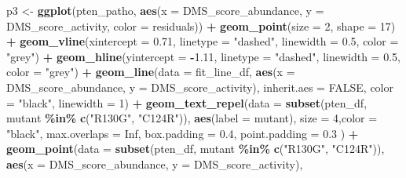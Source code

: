 \documentclass[
]{article}
\newenvironment{Shaded}{\begin{snugshade}}{\end{snugshade}}
\newcommand{\AttributeTok}[1]{\textcolor[rgb]{0.13,0.29,0.53}{#1}}
\newcommand{\ConstantTok}[1]{\textcolor[rgb]{0.56,0.35,0.01}{#1}}
\newcommand{\DecValTok}[1]{\textcolor[rgb]{0.00,0.00,0.81}{#1}}
\newcommand{\FloatTok}[1]{\textcolor[rgb]{0.00,0.00,0.81}{#1}}
\newcommand{\FunctionTok}[1]{\textcolor[rgb]{0.13,0.29,0.53}{\textbf{#1}}}
\newcommand{\NormalTok}[1]{#1}
\newcommand{\OtherTok}[1]{\textcolor[rgb]{0.56,0.35,0.01}{#1}}
\newcommand{\SpecialCharTok}[1]{\textcolor[rgb]{0.81,0.36,0.00}{\textbf{#1}}}
\newcommand{\StringTok}[1]{\textcolor[rgb]{0.31,0.60,0.02}{#1}}
\begin{document}
\begin{Shaded}
\begin{Highlighting}[]
\NormalTok{p3 }\OtherTok{\textless{}{-}} \FunctionTok{ggplot}\NormalTok{(pten\_patho, }\FunctionTok{aes}\NormalTok{(}\AttributeTok{x =}\NormalTok{ DMS\_score\_abundance, }\AttributeTok{y =}\NormalTok{ DMS\_score\_activity, }\AttributeTok{color =}\NormalTok{ residuals)) }\SpecialCharTok{+}
  \FunctionTok{geom\_point}\NormalTok{(}\AttributeTok{size =} \DecValTok{2}\NormalTok{, }\AttributeTok{shape =} \DecValTok{17}\NormalTok{) }\SpecialCharTok{+}
  \FunctionTok{geom\_vline}\NormalTok{(}\AttributeTok{xintercept =} \FloatTok{0.71}\NormalTok{, }\AttributeTok{linetype =} \StringTok{"dashed"}\NormalTok{, }\AttributeTok{linewidth =} \FloatTok{0.5}\NormalTok{, }\AttributeTok{color =} \StringTok{"grey"}\NormalTok{) }\SpecialCharTok{+}
  \FunctionTok{geom\_hline}\NormalTok{(}\AttributeTok{yintercept =} \SpecialCharTok{{-}}\FloatTok{1.11}\NormalTok{, }\AttributeTok{linetype =} \StringTok{"dashed"}\NormalTok{, }\AttributeTok{linewidth =} \FloatTok{0.5}\NormalTok{, }\AttributeTok{color =} \StringTok{"grey"}\NormalTok{) }\SpecialCharTok{+}
  \FunctionTok{geom\_line}\NormalTok{(}\AttributeTok{data =}\NormalTok{ fit\_line\_df, }\FunctionTok{aes}\NormalTok{(}\AttributeTok{x =}\NormalTok{ DMS\_score\_abundance, }\AttributeTok{y =}\NormalTok{ DMS\_score\_activity),}
            \AttributeTok{inherit.aes =} \ConstantTok{FALSE}\NormalTok{, }\AttributeTok{color =} \StringTok{"black"}\NormalTok{, }\AttributeTok{linewidth =} \DecValTok{1}\NormalTok{) }\SpecialCharTok{+}
      \FunctionTok{geom\_text\_repel}\NormalTok{(}\AttributeTok{data =} \FunctionTok{subset}\NormalTok{(pten\_df, mutant }\SpecialCharTok{\%in\%} \FunctionTok{c}\NormalTok{(}\StringTok{"R130G"}\NormalTok{, }\StringTok{"C124R"}\NormalTok{)),}
                  \FunctionTok{aes}\NormalTok{(}\AttributeTok{label =}\NormalTok{ mutant),}
                  \AttributeTok{size =} \DecValTok{4}\NormalTok{,}\AttributeTok{color =} \StringTok{"black"}\NormalTok{,}
                  \AttributeTok{max.overlaps =} \ConstantTok{Inf}\NormalTok{, }\AttributeTok{box.padding =} \FloatTok{0.4}\NormalTok{, }\AttributeTok{point.padding =} \FloatTok{0.3}
\NormalTok{  ) }\SpecialCharTok{+}
  \FunctionTok{geom\_point}\NormalTok{(}\AttributeTok{data =} \FunctionTok{subset}\NormalTok{(pten\_df, mutant }\SpecialCharTok{\%in\%} \FunctionTok{c}\NormalTok{(}\StringTok{"R130G"}\NormalTok{, }\StringTok{"C124R"}\NormalTok{)),}
             \FunctionTok{aes}\NormalTok{(}\AttributeTok{x =}\NormalTok{ DMS\_score\_abundance, }\AttributeTok{y =}\NormalTok{ DMS\_score\_activity),}

\end{Highlighting}
\end{Shaded}
\end{document}
